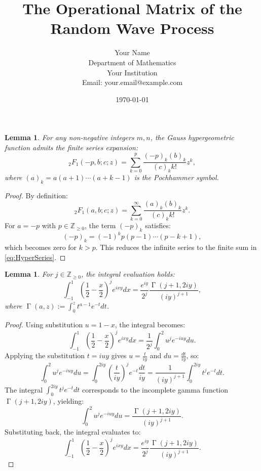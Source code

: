 \documentclass[12pt]{article}
\title{The Operational Matrix of the Random Wave Process}
\author{Your Name \\ Department of Mathematics \\ Your Institution \\ Email: your.email@example.com}
\date{\today}
\newtheorem{lemma}[theorem]{Lemma}
\DeclareMathOperator{\gamma}{\Gamma}
\begin{document}
\maketitle

\begin{lemma}\label{lem:HyperExpansions}
For any non-negative integers $m, n$, the Gauss hypergeometric function admits the finite series expansion:
\begin{equation}\label{eq:HyperSeries}
{}_2F_1(-p, b; c; z) = \sum_{k=0}^p \frac{(-p)_k (b)_k}{(c)_k k!} z^k,
\end{equation}
where $(a)_k = a(a+1)\cdots(a+k-1)$ is the Pochhammer symbol.
\end{lemma}

\begin{proof}
By definition:
\[
{}_2F_1(a, b; c; z) = \sum_{k=0}^\infty \frac{(a)_k (b)_k}{(c)_k k!} z^k.
\]
For $a = -p$ with $p \in \mathbb{Z}_{\geq 0}$, the term $(-p)_k$ satisfies:
\[
(-p)_k = (-1)^k p(p-1)\cdots(p-k+1),
\]
which becomes zero for $k > p$. This reduces the infinite series to the finite sum in \eqref{eq:HyperSeries}.
\end{proof}

\begin{lemma}\label{lem:IntegralGamma}
For $j \in \mathbb{Z}_{\geq 0}$, the integral evaluation holds:
\begin{equation}\label{eq:IntegralGamma}
\int_{-1}^1 \left(\frac{1}{2}-\frac{x}{2}\right)^j e^{i x y} dx = \frac{e^{iy}}{2^j}\frac{\gamma(j+1,2iy)}{(iy)^{j+1}},
\end{equation}
where $\gamma(a, z) := \int_0^z t^{a-1} e^{-t} dt$.
\end{lemma}

\begin{proof}
Using substitution $u = 1 - x$, the integral becomes:
\[
\int_{-1}^1 \left(\frac{1}{2}-\frac{x}{2}\right)^j e^{i x y} dx = \frac{1}{2^j} \int_0^{2} u^j e^{-iuy} du.
\]
Applying the substitution $t = iuy$ gives $u = \frac{t}{iy}$ and $du = \frac{dt}{iy}$, so:
\[
\int_0^2 u^j e^{-i u y} du = \int_0^{2iy} \left(\frac{t}{iy}\right)^j e^{-t} \frac{dt}{iy} = \frac{1}{(iy)^{j+1}} \int_0^{2iy} t^j e^{-t} dt.
\]
The integral $\int_0^{2iy} t^j e^{-t} dt$ corresponds to the incomplete gamma function $\gamma(j+1, 2iy)$, yielding:
\[
\int_0^2 u^j e^{-i u y} du = \frac{\gamma(j+1, 2iy)}{(iy)^{j+1}}.
\]
Substituting back, the integral evaluates to:
\[
\int_{-1}^1 \left(\frac{1}{2}-\frac{x}{2}\right)^j e^{i x y} dx = \frac{e^{iy}}{2^j} \frac{\gamma(j+1, 2iy)}{(iy)^{j+1}}.
\]
\end{proof}
\end{document}
